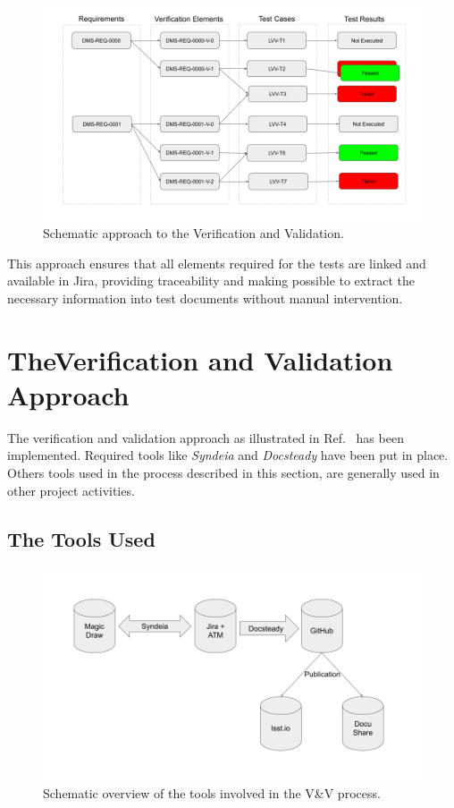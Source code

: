 \begin{figure}
\begin{center}
\includegraphics[width=\textwidth]{imgs/VandVSchema.png}
 \caption{Schematic approach to the Verification and Validation.}
 \label{fig:vandvschema}
\end{center}
\end{figure}

This approach ensures that all elements required for the tests are linked and available in Jira, 
providing traceability and making possible to extract the necessary information into test documents without manual intervention.


\section{TheVerification and Validation Approach}
\label{sec:approach}

The verification and validation approach as illustrated in  Ref.~  has been implemented.
Required tools like \textit{Syndeia} and \textit{Docsteady} have been put in place.
Others tools used in the process described in this section, are generally used in other project activities.


\subsection{The Tools Used}

\begin{figure}
\begin{center}
\includegraphics[width=\textwidth]{imgs/VandVtools.png}
 \caption{Schematic overview of the tools involved in the V\&V process.}
 \label{fig:vandvtools}
\end{center}
\end{figure}

